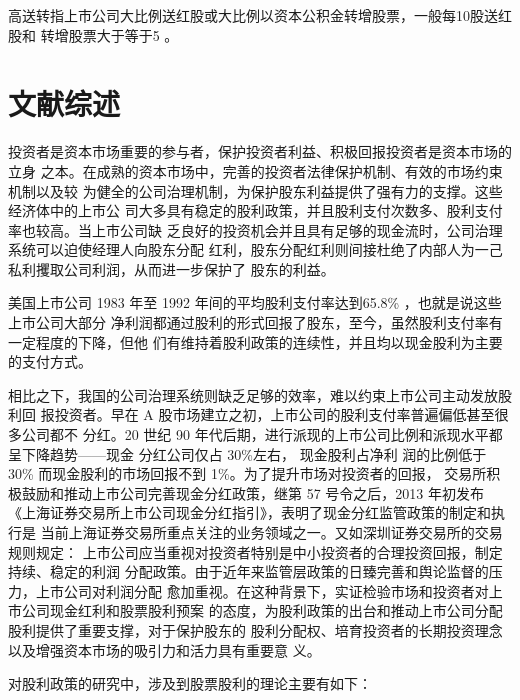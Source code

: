 \documentclass[../main]{subfiles}
\begin{document}
高送转指上市公司大比例送红股或大比例以资本公积金转增股票，一般每10股送红股和
转增股票大于等于5 。

\section{文献综述}%
\label{sec:document}

投资者是资本市场重要的参与者，保护投资者利益、积极回报投资者是资本市场的立身
之本。在成熟的资本市场中，完善的投资者法律保护机制、有效的市场约束机制以及较
为健全的公司治理机制，为保护股东利益提供了强有力的支撑。这些经济体中的上市公
司大多具有稳定的股利政策，并且股利支付次数多、股利支付率也较高。当上市公司缺
乏良好的投资机会并且具有足够的现金流时，公司治理系统可以迫使经理人向股东分配
红利，股东分配红利则间接杜绝了内部人为一己私利攫取公司利润，从而进一步保护了
股东的利益。

美国上市公司 1983 年至 1992 年间的平均股利支付率达到65.8\%
，\cite{李常青1999我国上市公司股利政策现状及其成因}也就是说这些上市公司大部分
净利润都通过股利的形式回报了股东，至今，虽然股利支付率有一定程度的下降，但他
们有维持着股利政策的连续性，并且均以现金股利为主要的支付方式。

相比之下，我国的公司治理系统则缺乏足够的效率，难以约束上市公司主动发放股利回
报投资者。早在 A 股市场建立之初，上市公司的股利支付率普遍偏低甚至很多公司都不
分红。20 世纪 90 年代后期，进行派现的上市公司比例和派现水平都呈下降趋势——现金
分红公司仅占 30\%左右，\cite{李常青2001股利政策理论与实证研究} 现金股利占净利
润的比例低于 30\% 而现金股利的市场回报不到 1\%。为了提升市场对投资者的回报，
交易所积极鼓励和推动上市公司完善现金分红政策，继第 57 号令之后，2013 年初发布
《上海证券交易所上市公司现金分红指引》，表明了现金分红监管政策的制定和执行是
当前上海证券交易所重点关注的业务领域之一。又如深圳证券交易所的交易规则规定：
上市公司应当重视对投资者特别是中小投资者的合理投资回报，制定持续、稳定的利润
分配政策。由于近年来监管层政策的日臻完善和舆论监督的压力，上市公司对利润分配
愈加重视。在这种背景下，实证检验市场和投资者对上市公司现金红利和股票股利预案
的态度，为股利政策的出台和推动上市公司分配股利提供了重要支撑，对于保护股东的
股利分配权、培育投资者的长期投资理念以及增强资本市场的吸引力和活力具有重要意
义。\cite{Avner1982Stockholder,Kryzanowski2009Trading,Walther2007Stock,
  CHRISTOPHER1987The,Mcnichols1990Stock,Merton1961Dividend,Hong2012Trading,
  Graeme1996Stice}

对股利政策的研究中，涉及到股票股利的理论主要有如下：
\end{document}
